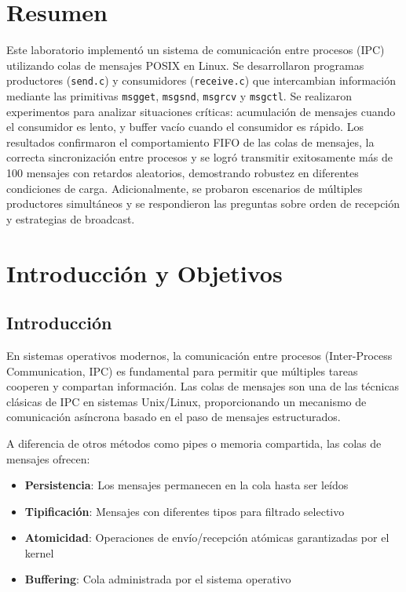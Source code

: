 \documentclass[10pt]{article}
\begin{document}
\section{Resumen}
Este laboratorio implementó un sistema de comunicación entre procesos (IPC) utilizando colas de mensajes POSIX en Linux. Se desarrollaron programas productores (\texttt{send.c}) y consumidores (\texttt{receive.c}) que intercambian información mediante las primitivas \texttt{msgget}, \texttt{msgsnd}, \texttt{msgrcv} y \texttt{msgctl}. Se realizaron experimentos para analizar situaciones críticas: acumulación de mensajes cuando el consumidor es lento, y buffer vacío cuando el consumidor es rápido. Los resultados confirmaron el comportamiento FIFO de las colas de mensajes, la correcta sincronización entre procesos y se logró transmitir exitosamente más de 100 mensajes con retardos aleatorios, demostrando robustez en diferentes condiciones de carga. Adicionalmente, se probaron escenarios de múltiples productores simultáneos y se respondieron las preguntas sobre orden de recepción y estrategias de broadcast.

\clearpage

\section{Introducción y Objetivos}

\subsection{Introducción}
En sistemas operativos modernos, la comunicación entre procesos (Inter-Process Communication, IPC) es fundamental para permitir que múltiples tareas cooperen y compartan información. Las colas de mensajes son una de las técnicas clásicas de IPC en sistemas Unix/Linux, proporcionando un mecanismo de comunicación asíncrona basado en el paso de mensajes estructurados.

A diferencia de otros métodos como pipes o memoria compartida, las colas de mensajes ofrecen:
\begin{itemize}
  \item \textbf{Persistencia}: Los mensajes permanecen en la cola hasta ser leídos
  \item \textbf{Tipificación}: Mensajes con diferentes tipos para filtrado selectivo
  \item \textbf{Atomicidad}: Operaciones de envío/recepción atómicas garantizadas por el kernel
  \item \textbf{Buffering}: Cola administrada por el sistema operativo
\end{itemize}
\end{document}
